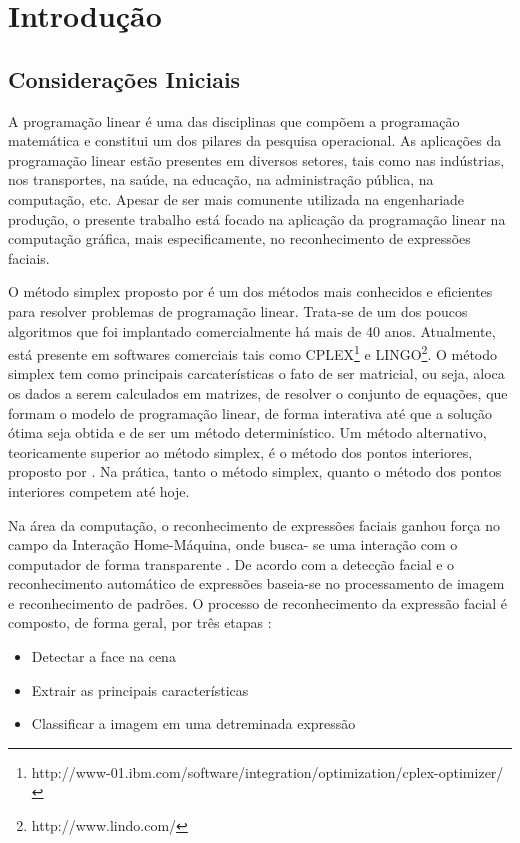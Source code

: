 \chapter{Introdução}

\section{Considerações Iniciais}
A programação linear é uma das disciplinas que compõem a programação matemática e constitui um dos pilares da pesquisa operacional. As aplicações da programação linear estão presentes em diversos setores, tais como nas indústrias, nos transportes, na saúde, na educação, na administração pública, na computação, etc. Apesar de ser mais comunente utilizada na engenhariade produção, o presente trabalho está focado na aplicação da programação linear na computação gráfica, mais especificamente, no reconhecimento de expressões faciais.

O método simplex proposto por  é um dos métodos mais conhecidos e eficientes para resolver problemas de programação linear. Trata-se de um dos poucos algoritmos que foi implantado comercialmente há mais de 40 anos. Atualmente, está presente em softwares comerciais tais como CPLEX\footnote{http://www-01.ibm.com/software/integration/optimization/cplex-optimizer/} e LINGO\footnote{http://www.lindo.com/}. O método simplex tem como principais carcaterísticas o fato de ser matricial, ou seja, aloca os dados a serem calculados em matrizes, de resolver o conjunto de equações, que formam o modelo de programação linear, de forma interativa até que a solução ótima seja obtida e de ser um método determinístico. Um método alternativo, teoricamente superior ao método simplex, é o método dos pontos interiores, proposto por . Na prática, tanto o método simplex, quanto o método dos pontos interiores competem até hoje.  

Na área da computação, o reconhecimento de expressões faciais ganhou força no campo da Interação Home-Máquina, onde busca- se uma interação com o computador de forma transparente \cite{Elizabeth}. De acordo com  a detecção facial e o reconhecimento automático de expressões baseia-se no processamento de imagem e reconhecimento de padrões. O processo de reconhecimento da expressão facial é composto, de forma geral, por três etapas \cite{Elizabeth}:
\begin{itemize}
\item Detectar a face na cena
\item Extrair as principais características
\item Classificar a imagem em uma detreminada expressão
\end{itemize}

